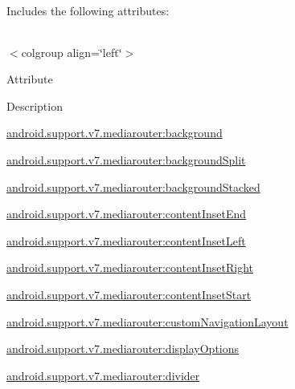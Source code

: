 Includes the following attributes\+:

\tabulinesep=1mm
\begin{longtabu} spread 0pt [c]{*{0}{|X[-1]}|}
\hline
\end{longtabu}
$<$colgroup align=\char`\"{}left\char`\"{}$>$ 

Attribute

Description 

{\ttfamily \hyperlink{classandroid_1_1support_1_1v7_1_1mediarouter_1_1R_1_1styleable_a84d5481885cf2060ab501c5dd03f0fd2}{android.\+support.\+v7.\+mediarouter\+:background}}

{\ttfamily \hyperlink{classandroid_1_1support_1_1v7_1_1mediarouter_1_1R_1_1styleable_ab203bd1cd9b9493b6f496c4fb5593e92}{android.\+support.\+v7.\+mediarouter\+:background\+Split}}

{\ttfamily \hyperlink{classandroid_1_1support_1_1v7_1_1mediarouter_1_1R_1_1styleable_ac5c86fa90bff4275662ebc51c94cbda2}{android.\+support.\+v7.\+mediarouter\+:background\+Stacked}}

{\ttfamily \hyperlink{classandroid_1_1support_1_1v7_1_1mediarouter_1_1R_1_1styleable_ae206c7fabfc44981bb04d4020240e52a}{android.\+support.\+v7.\+mediarouter\+:content\+Inset\+End}}

{\ttfamily \hyperlink{classandroid_1_1support_1_1v7_1_1mediarouter_1_1R_1_1styleable_a0fae6030af51792fafa6f48d490a69a4}{android.\+support.\+v7.\+mediarouter\+:content\+Inset\+Left}}

{\ttfamily \hyperlink{classandroid_1_1support_1_1v7_1_1mediarouter_1_1R_1_1styleable_a015913d4c4cc4f35f6b5377bf926d3c7}{android.\+support.\+v7.\+mediarouter\+:content\+Inset\+Right}}

{\ttfamily \hyperlink{classandroid_1_1support_1_1v7_1_1mediarouter_1_1R_1_1styleable_a16470c607bc14ed7d7bba8a623075442}{android.\+support.\+v7.\+mediarouter\+:content\+Inset\+Start}}

{\ttfamily \hyperlink{classandroid_1_1support_1_1v7_1_1mediarouter_1_1R_1_1styleable_a5c3f8aaa133e06d0779223802c38aa49}{android.\+support.\+v7.\+mediarouter\+:custom\+Navigation\+Layout}}

{\ttfamily \hyperlink{classandroid_1_1support_1_1v7_1_1mediarouter_1_1R_1_1styleable_a2da5ac029ba0fe946502ac4dea17263f}{android.\+support.\+v7.\+mediarouter\+:display\+Options}}

{\ttfamily \hyperlink{classandroid_1_1support_1_1v7_1_1mediarouter_1_1R_1_1styleable_a88863e673ee6e3ad8ecda463751ead1c}{android.\+support.\+v7.\+mediarouter\+:divider}}

